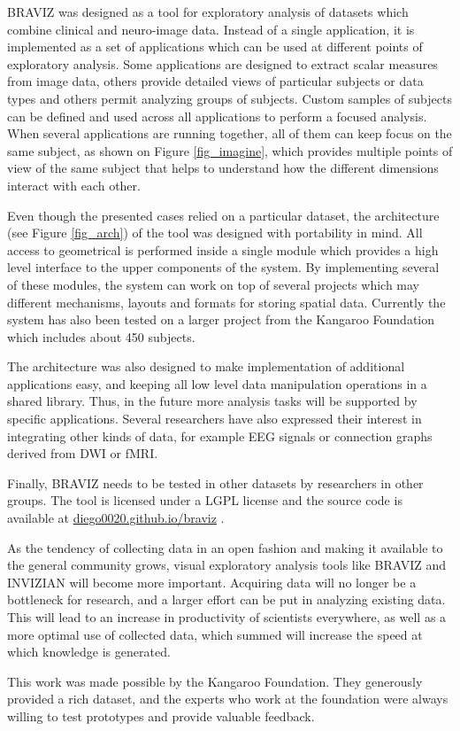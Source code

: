 \documentclass[twocolumn]{svjour3}
\begin{document}
BRAVIZ was designed as a tool for exploratory analysis of datasets which combine clinical and neuro-image data. Instead of a single application, it is implemented as a set of applications which can be used at different points of exploratory analysis. Some applications are designed to extract scalar measures from image data, others provide detailed views of particular subjects or data types and others permit analyzing groups of subjects. Custom samples of subjects can be defined and used across all applications to perform a focused analysis. When several applications are running together, all of them can keep focus on the same subject, as shown on Figure \ref{fig_imagine}, which provides multiple points of view of the same subject that helps to understand how the different dimensions interact with each other. 

Even though the presented cases relied on a particular dataset, the architecture (see Figure \ref{fig_arch}) of the tool was designed with portability in mind. All access to geometrical is performed inside a single module which provides a high level interface to the upper components of the system. By implementing several of these modules, the system can work on top of several projects which may different mechanisms, layouts and formats for storing spatial data. Currently the system has also been tested on a larger project from the Kangaroo Foundation which includes about 450 subjects. 

The architecture was also designed to make implementation of additional applications easy, and keeping all low level data manipulation operations in a shared library. Thus, in the future more analysis tasks will be supported by specific applications. Several researchers have also expressed their interest in integrating other kinds of data, for example EEG signals or connection graphs \cite{rubinov_complex_2010} derived from DWI or fMRI. 

Finally, BRAVIZ needs to be tested in other datasets by researchers in other groups. The tool is licensed under a LGPL license and the source code is available at \url{diego0020.github.io/braviz} . 

As the tendency of collecting data in an open fashion and making it available to the general community grows, visual exploratory analysis tools like BRAVIZ and INVIZIAN will become more important. Acquiring data will no longer be a bottleneck for research, and a larger effort can be put in analyzing existing data. This will lead to an increase in productivity of scientists everywhere, as well as a more optimal use of collected data, which summed will increase the speed at which knowledge is generated.

\begin{acknowledgements}

This work was made possible by the Kangaroo Foundation. They generously provided a rich dataset, and the experts who work at the foundation were always willing to test prototypes and provide valuable feedback.

\end{acknowledgements}

 

\end{document}
